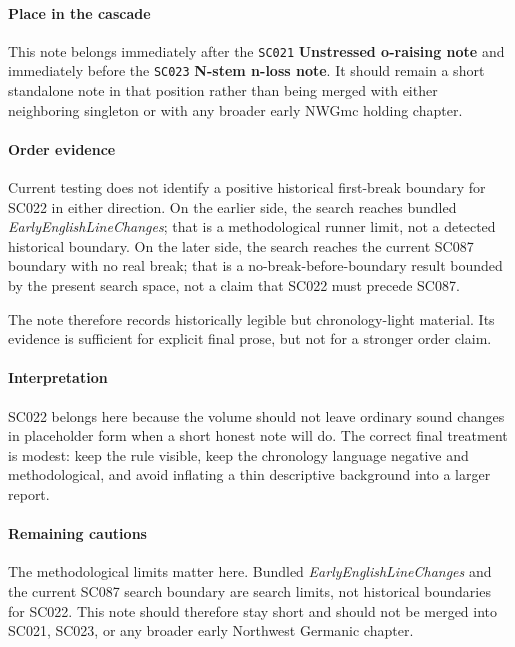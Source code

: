 \documentclass[
  british,
  a4paper,
]{article}
\begin{document}
\paragraph{Place in the cascade}\label{place-in-the-cascade-15}

This note belongs immediately after the \texttt{SC021}
\textbf{Unstressed o-raising note} and immediately before the
\texttt{SC023} \textbf{N-stem n-loss note}. It should remain a short
standalone note in that position rather than being merged with either
neighboring singleton or with any broader early NWGmc holding chapter.

\paragraph{Order evidence}\label{order-evidence-15}

Current testing does not identify a positive historical first-break
boundary for SC022 in either direction. On the earlier side, the search
reaches bundled \emph{EarlyEnglishLineChanges}; that is a methodological
runner limit, not a detected historical boundary. On the later side, the
search reaches the current SC087 boundary with no real break; that is a
no-break-before-boundary result bounded by the present search space, not
a claim that SC022 must precede SC087.

The note therefore records historically legible but chronology-light
material. Its evidence is sufficient for explicit final prose, but not
for a stronger order claim.

\paragraph{Interpretation}\label{interpretation-15}

SC022 belongs here because the volume should not leave ordinary sound
changes in placeholder form when a short honest note will do. The
correct final treatment is modest: keep the rule visible, keep the
chronology language negative and methodological, and avoid inflating a
thin descriptive background into a larger report.

\paragraph{Remaining cautions}\label{remaining-cautions-15}

The methodological limits matter here. Bundled
\emph{EarlyEnglishLineChanges} and the current SC087 search boundary are
search limits, not historical boundaries for SC022. This note should
therefore stay short and should not be merged into SC021, SC023, or any
broader early Northwest Germanic chapter.
\end{document}

